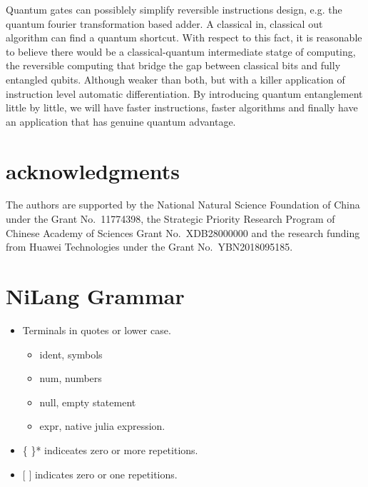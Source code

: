 \documentclass{article}
\newcommand{\<}{\langle}
\renewcommand{\>}{\rangle}
\begin{document}
Quantum gates can possiblely simplify reversible instructions design, e.g. the quantum fourier transformation based adder.
A classical in, classical out algorithm can find a quantum shortcut.
With respect to this fact, it is reasonable to believe there would be a classical-quantum intermediate statge of computing,
the reversible computing that bridge the gap between classical bits and fully entangled qubits.
Although weaker than both, but with a killer application of instruction level automatic differentiation.
By introducing quantum entanglement little by little, we will have faster instructions, faster algorithms and finally have an application that has genuine quantum advantage.

\section{acknowledgments}
The authors are supported by the National Natural Science Foundation of China under the Grant No.~11774398, the Strategic Priority Research Program of Chinese Academy of Sciences Grant No.~XDB28000000 and the research funding from Huawei Technologies under the Grant No.~YBN2018095185.



\newpage
\appendix
\onecolumn\newpage

\section{NiLang Grammar}\label{app:grammar}

\begin{itemize}
    \item Terminals in quotes or lower case.
    \begin{itemize}
        \item ident, symbols
        \item num, numbers
        \item null, empty statement
        \item expr, native julia expression.
    \end{itemize}
    \item \{ \}* indiceates zero or more repetitions.
    \item $[$ $]$  indicates zero or one repetitions.
\end{itemize}

\begin{minipage}{0.30\textwidth}

\end{minipage}
\end{document}
